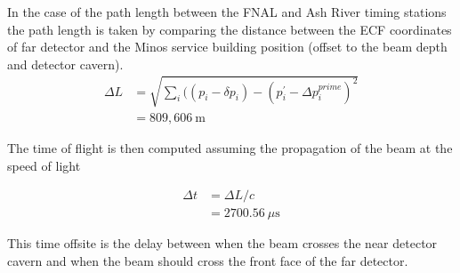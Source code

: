 In the case of the path length between the FNAL and Ash River timing
stations the path length is taken by comparing the distance between
the ECF coordinates of far detector and the Minos service building
position (offset to the beam depth and detector cavern).
\begin{align}
\Delta L &= \sqrt{\sum_{i} ( (p_i - \delta p_i) - (p_i^\prime - \Delta
  p_i^{prime})^2} \\
             &= 809,606~\text{m}
\end{align}

The time of flight is then computed assuming the propagation of the
beam at the speed of light

\begin{align}
\Delta t &= \Delta L / c \\
             &= 2700.56~\mu \text{s}
\end{align}

This time offsite is the delay between when the beam crosses the near
detector cavern and when the beam should cross the front face of the
far detector.